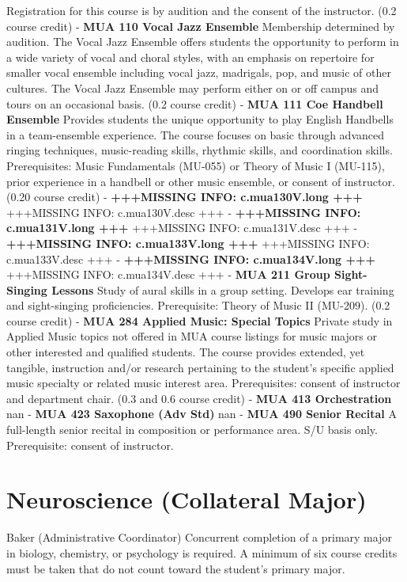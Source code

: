 \documentclass[
  letterpaper,
]{scrbook}
\begin{document}
Registration for this course is by audition and the consent of the
instructor. (0.2 course credit) - \textbf{MUA 110 Vocal Jazz Ensemble}
Membership determined by audition. The Vocal Jazz Ensemble offers
students the opportunity to perform in a wide variety of vocal and
choral styles, with an emphasis on repertoire for smaller vocal ensemble
including vocal jazz, madrigals, pop, and music of other cultures. The
Vocal Jazz Ensemble may perform either on or off campus and tours on an
occasional basis. (0.2 course credit) - \textbf{MUA 111 Coe Handbell
Ensemble} Provides students the unique opportunity to play English
Handbells in a team-ensemble experience. The course focuses on basic
through advanced ringing techniques, music-reading skills, rhythmic
skills, and coordination skills. Prerequisites: Music Fundamentals
(MU-055) or Theory of Music I (MU-115), prior experience in a handbell
or other music ensemble, or consent of instructor. (0.20 course credit)
- \textbf{+++MISSING INFO: c.mua130V.long +++} +++MISSING INFO:
c.mua130V.desc +++ - \textbf{+++MISSING INFO: c.mua131V.long +++}
+++MISSING INFO: c.mua131V.desc +++ - \textbf{+++MISSING INFO:
c.mua133V.long +++} +++MISSING INFO: c.mua133V.desc +++ -
\textbf{+++MISSING INFO: c.mua134V.long +++} +++MISSING INFO:
c.mua134V.desc +++ - \textbf{MUA 211 Group Sight-Singing Lessons} Study
of aural skills in a group setting. Develops ear training and
sight-singing proficiencies. Prerequisite: Theory of Music II (MU-209).
(0.2 course credit) - \textbf{MUA 284 Applied Music: Special Topics}
Private study in Applied Music topics not offered in MUA course listings
for music majors or other interested and qualified students. The course
provides extended, yet tangible, instruction and/or research pertaining
to the student's specific applied music specialty or related music
interest area. Prerequisites: consent of instructor and department
chair. (0.3 and 0.6 course credit) - \textbf{MUA 413 Orchestration} nan
- \textbf{MUA 423 Saxophone (Adv Std)} nan - \textbf{MUA 490 Senior
Recital} A full-length senior recital in composition or performance
area. S/U basis only. Prerequisite: consent of instructor.

\hypertarget{sec-neuroscience}{%
\section{Neuroscience (Collateral Major)}\label{sec-neuroscience}}

Baker (Administrative Coordinator) Concurrent completion of a primary
major in biology, chemistry, or psychology is required. A minimum of six
course credits must be taken that do not count toward the student's
primary major.
\end{document}
